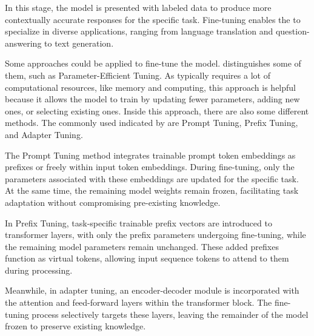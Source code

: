 In this stage, the model is presented with labeled data to produce more contextually accurate responses for the specific task. Fine-tuning enables the {\llm} to specialize in diverse applications, ranging from language translation and question-answering to text generation. 

Some approaches could be applied to fine-tune the model. \citet{naveed_comprehensive_2023} distinguishes some of them, such as Parameter-Efficient Tuning. As {\llm} typically requires a lot of computational resources, like memory and computing, this approach is helpful because it allows the model to train by updating fewer parameters, adding new ones, or selecting existing ones. Inside this approach, there are also some different methods. The commonly used indicated by \citet{naveed_comprehensive_2023} are Prompt Tuning, Prefix Tuning, and Adapter Tuning.

The Prompt Tuning method integrates trainable prompt token embeddings as prefixes or freely within input token embeddings. During fine-tuning, only the parameters associated with these embeddings are updated for the specific task. At the same time, the remaining model weights remain frozen, facilitating task adaptation without compromising pre-existing knowledge.

In Prefix Tuning, task-specific trainable prefix vectors are introduced to transformer layers, with only the prefix parameters undergoing fine-tuning, while the remaining model parameters remain unchanged. These added prefixes function as virtual tokens, allowing input sequence tokens to attend to them during processing.

Meanwhile, in adapter tuning, an encoder-decoder module is incorporated with the attention and feed-forward layers within the transformer block. The fine-tuning process selectively targets these layers, leaving the remainder of the model frozen to preserve existing knowledge.





